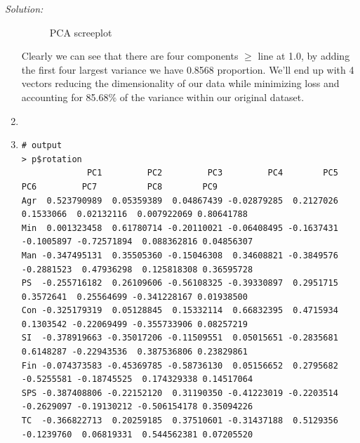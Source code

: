 \documentclass{article}
\newenvironment{solution}
    {\textit{Solution:}}
    {}
\begin{document}
\begin{solution}
\begin{enumerate}
\begin{figure}[h]
		\caption{PCA screeplot}
	\end{figure}
Clearly we can see that there are four components $\geq$ line at 1.0, by adding the first four largest variance we have 0.8568 proportion. We’ll end up with 4 vectors reducing the dimensionality of our data while minimizing loss and accounting for 85.68\% of the variance within our original dataset.
\item
\newpage
\item
	\begin{lstlisting}
# output
> p$rotation
             PC1         PC2         PC3         PC4        PC5        PC6         PC7          PC8        PC9
Agr  0.523790989  0.05359389  0.04867439 -0.02879285  0.2127026  0.1533066  0.02132116  0.007922069 0.80641788
Min  0.001323458  0.61780714 -0.20110021 -0.06408495 -0.1637431 -0.1005897 -0.72571894  0.088362816 0.04856307
Man -0.347495131  0.35505360 -0.15046308  0.34608821 -0.3849576 -0.2881523  0.47936298  0.125818308 0.36595728
PS  -0.255716182  0.26109606 -0.56108325 -0.39330897  0.2951715  0.3572641  0.25564699 -0.341228167 0.01938500
Con -0.325179319  0.05128845  0.15332114  0.66832395  0.4715934  0.1303542 -0.22069499 -0.355733906 0.08257219
SI  -0.378919663 -0.35017206 -0.11509551  0.05015651 -0.2835681  0.6148287 -0.22943536  0.387536806 0.23829861
Fin -0.074373583 -0.45369785 -0.58736130  0.05156652  0.2795682 -0.5255581 -0.18745525  0.174329338 0.14517064
SPS -0.387408806 -0.22152120  0.31190350 -0.41223019 -0.2203514 -0.2629097 -0.19130212 -0.506154178 0.35094226
TC  -0.366822713  0.20259185  0.37510601 -0.31437188  0.5129356 -0.1239760  0.06819331  0.544562381 0.07205520
	\end{lstlisting}
	
\end{enumerate}
\end{solution}
\newpage
\end{document}
